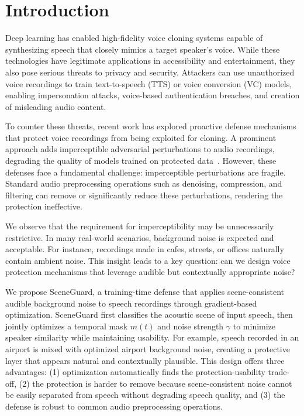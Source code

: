 \section{Introduction}

Deep learning has enabled high-fidelity voice cloning systems capable of synthesizing speech that closely mimics a target speaker's voice. While these technologies have legitimate applications in accessibility and entertainment, they also pose serious threats to privacy and security. Attackers can use unauthorized voice recordings to train text-to-speech (TTS) or voice conversion (VC) models, enabling impersonation attacks, voice-based authentication breaches, and creation of misleading audio content.

To counter these threats, recent work has explored proactive defense mechanisms that protect voice recordings from being exploited for cloning. A prominent approach adds imperceptible adversarial perturbations to audio recordings, degrading the quality of models trained on protected data~\citep{safespeech,voiceblock}. However, these defenses face a fundamental challenge: imperceptible perturbations are fragile. Standard audio preprocessing operations such as denoising, compression, and filtering can remove or significantly reduce these perturbations, rendering the protection ineffective.

We observe that the requirement for imperceptibility may be unnecessarily restrictive. In many real-world scenarios, background noise is expected and acceptable. For instance, recordings made in cafes, streets, or offices naturally contain ambient noise. This insight leads to a key question: can we design voice protection mechanisms that leverage audible but contextually appropriate noise?

We propose SceneGuard, a training-time defense that applies scene-consistent audible background noise to speech recordings through gradient-based optimization. SceneGuard first classifies the acoustic scene of input speech, then jointly optimizes a temporal mask $m(t)$ and noise strength $\gamma$ to minimize speaker similarity while maintaining usability. For example, speech recorded in an airport is mixed with optimized airport background noise, creating a protective layer that appears natural and contextually plausible. This design offers three advantages: (1) optimization automatically finds the protection-usability trade-off, (2) the protection is harder to remove because scene-consistent noise cannot be easily separated from speech without degrading speech quality, and (3) the defense is robust to common audio preprocessing operations.

